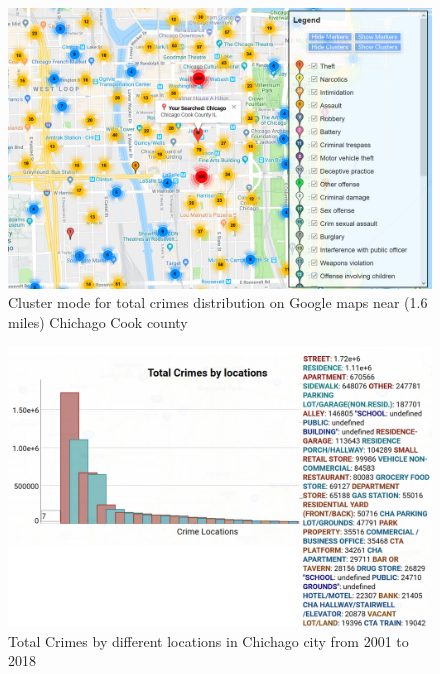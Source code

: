 \begin{figure}[htb]
	\centering\includegraphics[width=\columnwidth]{../images/geo2.jpg}
	\caption{Cluster mode for total crimes distribution on Google maps near (1.6 miles) Chichago Cook county}\label{fig:time-top10crimes-local}
\end{figure}

\begin{figure}[htb]
	\centering\includegraphics[width=\columnwidth]{../images/geo3.jpg}
	\caption{Total Crimes by different locations in Chichago city from 2001 to 2018}\label{fig:year-top10crimes-local}
\end{figure}

